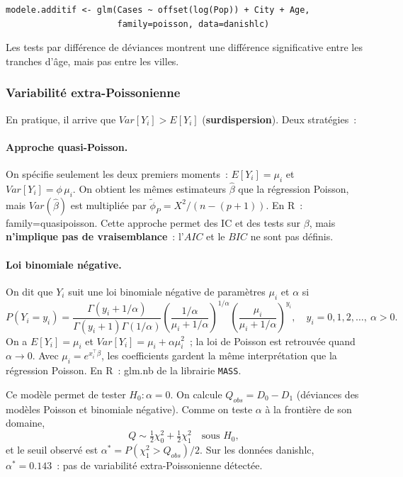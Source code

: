 \documentclass[11pt,letterpaper]{article}
\begin{document}
\begin{verbatim}
modele.additif <- glm(Cases ~ offset(log(Pop)) + City + Age,
                      family=poisson, data=danishlc)
\end{verbatim}
Les tests par différence de déviances montrent une différence significative entre les tranches d'âge, mais pas entre les villes.

\subsubsection{Variabilité extra-Poissonienne}

En pratique, il arrive que $Var[Y_i] > E[Y_i]$ (\textbf{surdispersion}). Deux stratégies~:

\paragraph{Approche quasi-Poisson.} On spécifie seulement les deux premiers moments~: $E[Y_i] = \mu_i$ et $Var[Y_i] = \phi\,\mu_i$. On obtient les mêmes estimateurs $\hat\beta$ que la régression Poisson, mais $Var(\hat\beta)$ est multipliée par $\tilde\phi_P = X^2/(n-(p+1))$. En \textrm{R}~: \textsf{family=quasipoisson}. Cette approche permet des IC et des tests sur $\beta$, mais \textbf{n'implique pas de vraisemblance}~: l'$AIC$ et le $BIC$ ne sont pas définis.

\paragraph{Loi binomiale négative.} On dit que $Y_i$ suit une loi binomiale négative de paramètres $\mu_i$ et $\alpha$ si
$$P(Y_i = y_i) = \frac{\Gamma(y_i + 1/\alpha)}{\Gamma(y_i+1)\Gamma(1/\alpha)}\left(\frac{1/\alpha}{\mu_i + 1/\alpha}\right)^{1/\alpha}\left(\frac{\mu_i}{\mu_i + 1/\alpha}\right)^{y_i}, \quad y_i = 0,1,2,\ldots,\ \alpha > 0.$$
On a $E[Y_i] = \mu_i$ et $Var[Y_i] = \mu_i + \alpha\mu_i^2$~; la loi de Poisson est retrouvée quand $\alpha \to 0$. Avec $\mu_i = e^{x_i^\top\beta}$, les coefficients gardent la même interprétation que la régression Poisson. En \textrm{R}~: \textsf{glm.nb} de la librairie \texttt{MASS}.

Ce modèle permet de tester $H_0 : \alpha = 0$. On calcule $Q_{obs} = D_0 - D_1$ (déviances des modèles Poisson et binomiale négative). Comme on teste $\alpha$ à la frontière de son domaine,
$$Q \sim \tfrac{1}{2}\chi^2_0 + \tfrac{1}{2}\chi^2_1 \quad\mbox{sous } H_0,$$
et le seuil observé est $\alpha^* = P(\chi^2_1 > Q_{obs})/2$. Sur les données \textsf{danishlc}, $\alpha^* = 0.143$~: pas de variabilité extra-Poissonienne détectée.
\end{document}
